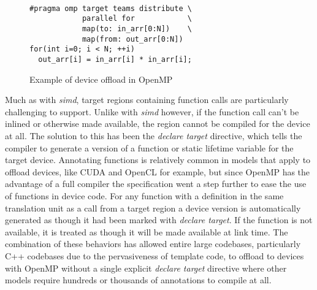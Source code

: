 \begin{figure}
\begin{verbatim}

#pragma omp target teams distribute \
            parallel for            \
            map(to: in_arr[0:N])    \
            map(from: out_arr[0:N])
for(int i=0; i < N; ++i)
  out_arr[i] = in_arr[i] * in_arr[i];
\end{verbatim}
\caption{Example of device offload in OpenMP}
\label{fig:target-loop}
\end{figure}


Much as with \emph{simd}, target regions containing function calls are
particularly challenging to support.  Unlike with \emph{simd} however, if the
function call can't be inlined or otherwise made available, the region cannot be
compiled for the device at all.  The solution to this has been the \emph{declare
target} directive, which tells the compiler to generate a version of a function
or static lifetime variable for the target device.  Annotating functions is relatively
common in models that apply to offload devices, like CUDA and OpenCL for
example, but since OpenMP has the advantage of a full compiler the specification
went a step further to ease the use of functions in device code.  For any
function with a definition in the same translation unit as a call from a target
region a device version is automatically generated as though it had been marked
with \emph{declare target}.  If the function is not available, it is treated as
though it will be made available at link time.  The combination of these
behaviors has allowed entire large codebases, particularly C++ codebases due to
the pervasiveness of template code, to offload to devices with OpenMP without
a single explicit \emph{declare target} directive where other models require
hundreds or thousands of annotations to compile at all.



